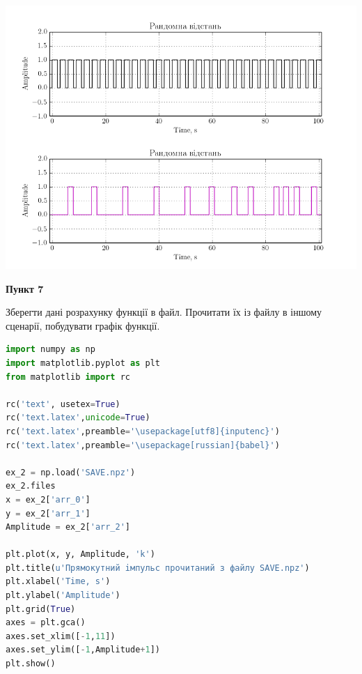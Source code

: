 \documentclass[a4paper,12pt]{article}
\begin{document}
\begin{center}
\includegraphics[height = 13 cm,width=16 cm]{6.3f.png}
\end{center}



\begin{center}
\textbf{Пункт 7}\par
\end{center}
Зберегти дані розрахунку функції в файл. Прочитати їх із файлу в іншому сценарії, побудувати графік функції.\par

\begin{lstlisting}[language=Python]
import numpy as np
import matplotlib.pyplot as plt
from matplotlib import rc

rc('text', usetex=True)
rc('text.latex',unicode=True)
rc('text.latex',preamble='\usepackage[utf8]{inputenc}')
rc('text.latex',preamble='\usepackage[russian]{babel}')

ex_2 = np.load('SAVE.npz')
ex_2.files
x = ex_2['arr_0']
y = ex_2['arr_1']
Amplitude = ex_2['arr_2']

plt.plot(x, y, Amplitude, 'k')
plt.title(u'Прямокутний iмпульс прочитаний з файлу SAVE.npz')
plt.xlabel('Time, s')
plt.ylabel('Amplitude')
plt.grid(True)
axes = plt.gca()
axes.set_xlim([-1,11])
axes.set_ylim([-1,Amplitude+1])
plt.show()
\end{lstlisting}
\end{document}
